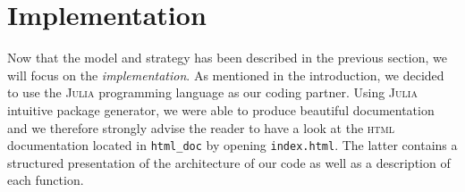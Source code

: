 \section{Implementation} %
\label{sec:implementation}
Now that the model and strategy has been described in the previous
section, we will focus on the \emph{implementation}.
As mentioned in the introduction, we decided to use the \textsc{Julia}
programming language as our coding partner.
Using \textsc{Julia} intuitive package generator, we were able to
produce beautiful documentation and we therefore strongly advise
the reader to have a look at the \textsc{html} documentation located
in \texttt{html_doc} by opening \texttt{index.html}.
The latter contains a structured presentation of the architecture
of our code as well as a description of each function.



